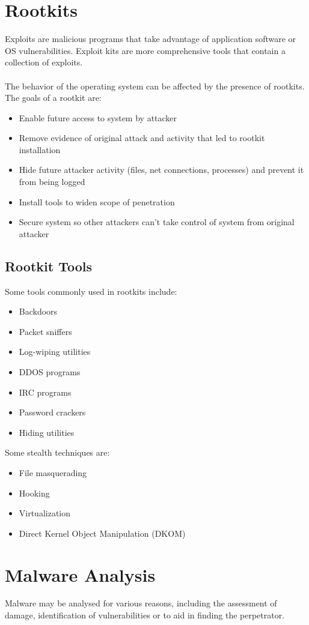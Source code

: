 \documentclass[10pt,a4paper]{report}
\begin{document}
\section{Rootkits}
Exploits are malicious programs that take advantage of application software or OS vulnerabilities. Exploit kits are more comprehensive tools that contain a collection of exploits.\\
\\
The behavior of the operating system can be affected by the presence of rootkits. The goals of a rootkit are:
\begin{itemize}
\item Enable future access to system by attacker
\item Remove evidence of original attack and activity that led to rootkit installation
\item Hide future attacker activity (files, net connections, processes) and prevent it from being logged
\item Install tools to widen scope of penetration
\item Secure system so other attackers can’t take control of system from original attacker
\end{itemize}
\subsection{Rootkit Tools}
Some tools commonly used in rootkits include:
\begin{itemize}
\item Backdoors
\item Packet sniffers
\item Log-wiping utilities
\item DDOS programs
\item IRC programs
\item Password crackers
\item Hiding utilities
\end{itemize}
Some stealth techniques are:
\begin{itemize}
\item File masquerading
\item Hooking
\item Virtualization
\item Direct Kernel Object Manipulation (DKOM)
\end{itemize}
\section{Malware Analysis}
Malware may be analysed for various reasons, including the assessment of damage, identification of vulnerabilities or to aid in finding the perpetrator.
\end{document}
